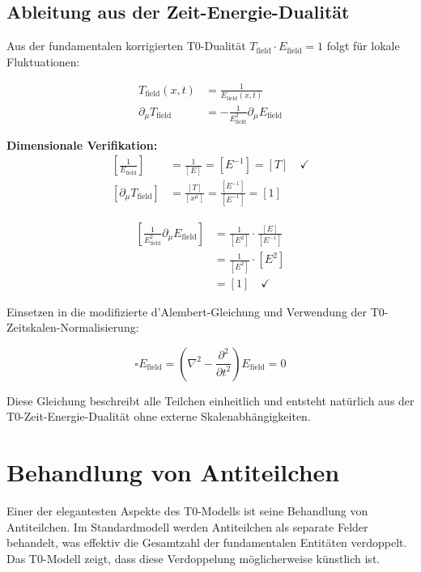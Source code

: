 \documentclass[12pt,a4paper]{report}
\begin{document}
\subsection{Ableitung aus der Zeit-Energie-Dualität}
\label{subsec:derivation_wave_equation}

Aus der fundamentalen korrigierten T0-Dualität $T_{\text{field}} \cdot E_{\text{field}} = 1$ folgt für lokale Fluktuationen:

\begin{align}
	T_{\text{field}}(x,t) &= \frac{1}{E_{\text{field}}(x,t)} \\
	\partial_\mu T_{\text{field}} &= -\frac{1}{E_{\text{field}}^2} \partial_\mu E_{\text{field}}
\end{align}

\textbf{Dimensionale Verifikation:}
\begin{align}
	\left[\frac{1}{E_{\text{field}}}\right] &= \frac{1}{[E]} = [E^{-1}] = [T] \quad \checkmark \\
	\left[\partial_\mu T_{\text{field}}\right] &= \frac{[T]}{[x^\mu]} = \frac{[E^{-1}]}{[E^{-1}]} = [1]
\end{align}

\begin{align}
	\left[\frac{1}{E_{\text{field}}^2} \partial_\mu E_{\text{field}}\right] &= \frac{1}{[E^2]} \cdot \frac{[E]}{[E^{-1}]} \\
	&= \frac{1}{[E^2]} \cdot [E^2] \\
	&= [1] \quad \checkmark
\end{align}

Einsetzen in die modifizierte d'Alembert-Gleichung und Verwendung der T0-Zeitskalen-Normalisierung:

\begin{equation}
	\square E_{\text{field}} = \left(\nabla^2 - \frac{\partial^2}{\partial t^2}\right) E_{\text{field}} = 0
	\label{eq:universal_wave_equation}
\end{equation}

Diese Gleichung beschreibt alle Teilchen einheitlich und entsteht natürlich aus der T0-Zeit-Energie-Dualität ohne externe Skalenabhängigkeiten.	
	\section{Behandlung von Antiteilchen}
	
	Einer der elegantesten Aspekte des T0-Modells ist seine Behandlung von Antiteilchen. Im Standardmodell werden Antiteilchen als separate Felder behandelt, was effektiv die Gesamtzahl der fundamentalen Entitäten verdoppelt. Das T0-Modell zeigt, dass diese Verdoppelung möglicherweise künstlich ist.
	
\end{document}

